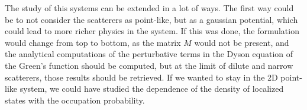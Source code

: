 \documentclass[a4paper,12pt]{article}
\begin{document}
The study of this systems can be extended in a lot of ways. The first way could be to not consider the scatterers as point-like, but as a gaussian potential, which could lead to more richer physics in the system. If this was done, the formulation would change from top to bottom, as the matrix $M$ would not be present, and the analytical computations of the perturbative terms in the Dyson equation of the Green's function should be computed, but at the limit of dilute and narrow scatterers, those results should be retrieved. If we wanted to stay in the 2D point-like system, we could have studied the dependence of the density of localized states with the occupation probability.

\newpage

\medskip



\clearpage
\newpage

\begin{appendices}





\end{appendices}
\end{document}
